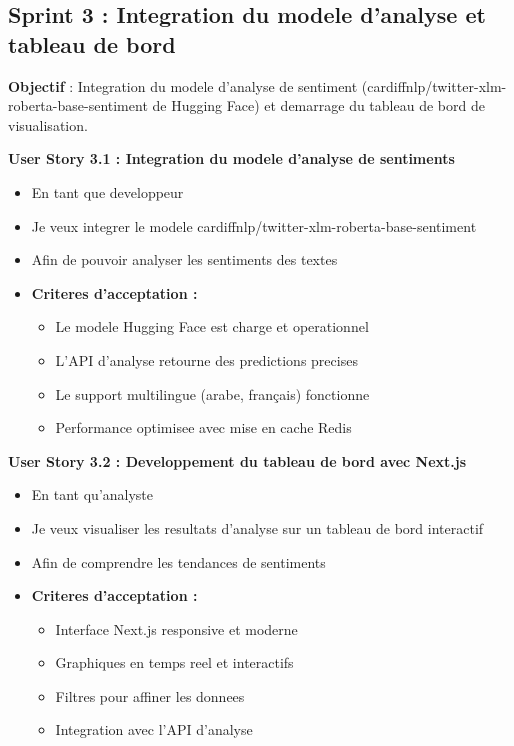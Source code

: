 \subsection{Sprint 3 : Integration du modele d'analyse et tableau de bord}

\textbf{Objectif} : Integration du modele d'analyse de sentiment (cardiffnlp/twitter-xlm-roberta-base-sentiment de Hugging Face) et demarrage du tableau de bord de visualisation.

\textbf{User Story 3.1 : Integration du modele d'analyse de sentiments}
\begin{itemize}
    \item En tant que developpeur
    \item Je veux integrer le modele cardiffnlp/twitter-xlm-roberta-base-sentiment
    \item Afin de pouvoir analyser les sentiments des textes
    \item \textbf{Criteres d'acceptation :}
    \begin{itemize}
        \item Le modele Hugging Face est charge et operationnel
        \item L'API d'analyse retourne des predictions precises
        \item Le support multilingue (arabe, français) fonctionne
        \item Performance optimisee avec mise en cache Redis
    \end{itemize}
\end{itemize}

\textbf{User Story 3.2 : Developpement du tableau de bord avec Next.js}
\begin{itemize}
    \item En tant qu'analyste
    \item Je veux visualiser les resultats d'analyse sur un tableau de bord interactif
    \item Afin de comprendre les tendances de sentiments
    \item \textbf{Criteres d'acceptation :}
    \begin{itemize}
        \item Interface Next.js responsive et moderne
        \item Graphiques en temps reel et interactifs
        \item Filtres pour affiner les donnees
        \item Integration avec l'API d'analyse
    \end{itemize}
\end{itemize}

